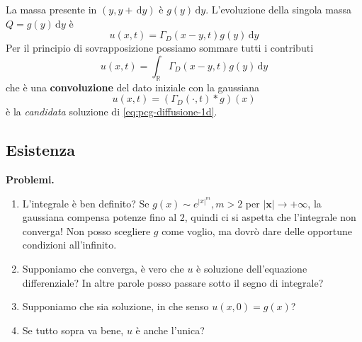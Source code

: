 \documentclass[10pt,a4paper,twoside,openright]{book}
\newcommand{\x}{\mathbf{x}}
\newcommand{\de}{\,\mathrm d}
\newcommand{\dy}{\de y}
\begin{document}
La massa presente in $(y,y+\dy)$ è $g(y) \dy$. L'evoluzione della singola massa $Q=g(y) \dy$ è
\begin{equation*}
    u(x,t) =\Gamma _{D}(x-y,t) g(y) \dy
\end{equation*}
Per il principio di sovrapposizione possiamo sommare tutti i contributi
\begin{equation*}
    u(x,t) =\int _{\mathbb{R}} \Gamma _{D}(x-y,t) g(y) \dy
\end{equation*}
che è una \textbf{convoluzione} del dato iniziale con la gaussiana
\begin{equation*}
    u(x,t) =(\Gamma _{D}(\cdotp,t) *g)(x)
\end{equation*}
è la \textit{candidata} soluzione di \eqref{eq:pcg-diffusione-1d}.
\subsection{Esistenza}

\textbf{Problemi.}
\begin{enumerate}
    \item L'integrale è ben definito? Se $g(x) \sim e^{|x|^m},m >2$ per $|\x| \rightarrow +\infty $, la gaussiana compensa potenze fino al $2$, quindi ci si aspetta che l'integrale non converga! Non posso scegliere $g$ come voglio, ma dovrò dare delle opportune condizioni all'infinito.
    \item Supponiamo che converga, è vero che $u$ è soluzione dell'equazione differenziale? In altre parole posso passare sotto il segno di integrale?
    \item Supponiamo che sia soluzione, in che senso $u(x,0) =g(x)$?
    \item Se tutto sopra va bene, $u$ è anche l'unica?
\end{enumerate}
\end{document}
